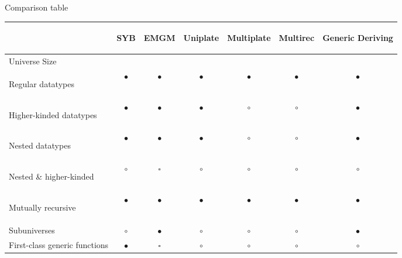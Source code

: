 \documentclass[10pt]{beamer}
\newcommand{\sufficient}{\tiny{$ \square $}}
\begin{document}
\begin{frame}{Comparison table}


\begin{table}[ht]
	\tiny
		
\begin{tabular}{l | c c c c c c}
& \begin{tiny}
SYB
\end{tiny} & \begin{tiny}
EMGM
\end{tiny} & \begin{tiny}
Uniplate
\end{tiny} & \begin{tiny}
Multiplate
\end{tiny} & \begin{tiny}
Multirec
\end{tiny} & \begin{tiny}
Generic Deriving
\end{tiny} \\
\hline
Universe Size & & & & & & \\
\begin{tiny}
Regular datatypes
\end{tiny} & $ \bullet $ & $ \bullet $ & $ \bullet $ & $ \bullet $ & $\bullet$ & $ \bullet $ \\
\begin{tiny}
Higher-kinded datatypes
\end{tiny} & $ \bullet $ & $ \bullet $ & $ \bullet $ & $ \circ $ & $ \circ $ & $ \bullet $ \\
\begin{tiny}
Nested datatypes
\end{tiny} & $ \bullet $ & $ \bullet $ & $ \bullet $ & $ \circ $ & $ \circ $ & $ \bullet $ \\
\begin{tiny}
Nested \& higher-kinded
\end{tiny} & $ \circ $ & \sufficient & $ \circ $ & $ \circ $ & $ \circ $ & $ \circ $ \\
\begin{tiny}
Mutually recursive
\end{tiny} & $ \bullet $ & $ \bullet $ & $ \bullet $ & $ \bullet $ & $ \bullet $ & $ \bullet $ \\
Subuniverses & $ \circ $ & $ \bullet $ & $ \circ $ & $ \circ $ & $ \circ $ & $ \bullet $ \\
\hline
First-class generic functions & $ \bullet $ & \sufficient & $ \circ $ & $ \circ $ & $ \circ $ & $ \circ $ \\

\end{tabular}
\end{table}
\end{frame}
\end{document}

